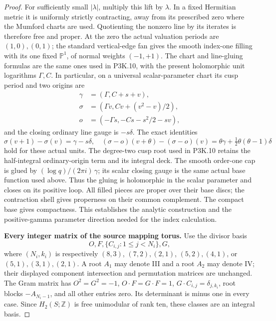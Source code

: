 \begin{proof}
For sufficiently small \(|\lambda|\), multiply this lift by
\(\lambda\).  In a fixed Hermitian metric it is uniformly strictly
contracting, away from its prescribed zero where the Mumford charts
are used.  Quotienting the nonzero line by its iterates is therefore
free and proper.  At the zero the actual valuation periods are
\((1,0),(0,1)\); the standard vertical-edge fan gives the smooth
index-one filling with its one fixed \(\mathbb P^1\), of normal
weights \((-1,+1)\).  The chart and line-gluing formulas are the
same ones used in P3K.10, with the present holomorphic unit logarithms
\(\Gamma,C\).  In particular, on a universal scalar-parameter
chart its cusp period and two origins are
\[
 \begin{aligned}
 \gamma&=(\Gamma,C+s+v),\\
 \sigma&=(\Gamma v,Cv+(v^2-v)/2),\\
 o&=(-\Gamma s,-Cs-s^2/2-sv),
 \end{aligned}                                                     \tag{P3K.22.3}
\]
and the closing ordinary line gauge is \(-s\delta\).  The exact
identities
\[
 \sigma(v+1)-\sigma(v)=\gamma-s\delta,
 \quad (\sigma-o)(v+\theta)-(\sigma-o)(v)
      =\theta\gamma+\tfrac12\theta(\theta-1)\delta
\]
hold for these actual units.  The degree-two cusp root used in
P3K.10 retains the half-integral ordinary-origin term and its integral
deck.  The smooth order-one cap is glued by
\((\log q)/(2\pi i)\,\gamma\); its scalar closing gauge is the
same actual base function used above.  Thus the gluing is holomorphic
in the scalar parameter and closes on its positive loop.  All filled
pieces are proper over their base discs; the contraction shell gives
properness on their common complement.  The compact base gives
compactness.  This establishes the analytic construction and the
positive-gamma parameter direction needed for the index calculation.

\par\medskip\noindent\textbf{Every integer matrix of the source mapping torus.}\enspace
Use the divisor basis
\[
 O,F,\{C_{i,j}:1\le j<N_i\},G,
\]
where \((N_i,k_i)\) is respectively
\((8,3)\), \((7,2),(2,1)\), \((5,2),(4,1)\), or
\((5,1),(3,1),(2,1)\).  A root \(A_1\) may denote III and
a root \(A_2\) may denote IV; their displayed component intersection
and permutation matrices are unchanged.  The Gram matrix has
\(O^2=G^2=-1\), \(O\cdot F=G\cdot F=1\),
\(G\cdot C_{i,j}=\delta_{j,k_i}\), root blocks
\(-A_{N_i-1}\), and all other entries zero.  Its determinant is
minus one in every case.  Since \(H_2(S;\mathbb Z)\) is free
unimodular of rank ten, these classes are an integral basis.


\end{proof}
